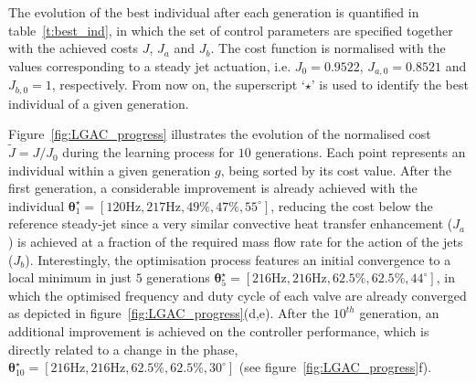The evolution of the best individual after each generation is quantified in table~\ref{t:best_ind}, in which the set of control parameters are specified together with the achieved costs $J$, $J_a$ and $J_b$. The cost function is normalised with the values corresponding to a steady jet actuation, i.e. $J_0 = 0.9522$, $J_{a,0} = 0.8521$ and $J_{b,0} = 1$, respectively. From now on, the superscript `$\star$' is used to identify the best individual of a given generation. 

Figure~\ref{fig:LGAC_progress} illustrates the evolution of the normalised cost $\tilde{J}=J/J_0$ during the learning process for $10$ generations. Each point represents an individual within a given generation $g$, being sorted by its cost value. After the first generation, a considerable improvement is already achieved with the individual $\bm{\theta}^\star_1 = [120\mathrm{Hz}, 217\mathrm{Hz}, 49\%, 47\%, 55^\circ]$, reducing the cost below the reference steady-jet since a very similar convective heat transfer enhancement ($J_a$) is achieved at a fraction of the required mass flow rate for the action of the jets ($J_b$). Interestingly, the optimisation process features an initial convergence to a local minimum in just $5$ generations $\bm{\theta}^\star_5 = [216\mathrm{Hz}, 216\mathrm{Hz}, 62.5\%, 62.5\%, 44^\circ]$, in which the optimised frequency and duty cycle of each valve are already converged as depicted in figure~\ref{fig:LGAC_progress}(d,e). After the $10^{th}$ generation, an additional improvement is achieved on the controller performance, which is directly related to a change in the phase, $\bm{\theta}^\star_{10} = [216\mathrm{Hz}, 216\mathrm{Hz}, 62.5\%, 62.5\%, 30^\circ]$ (see figure~\ref{fig:LGAC_progress}f).

